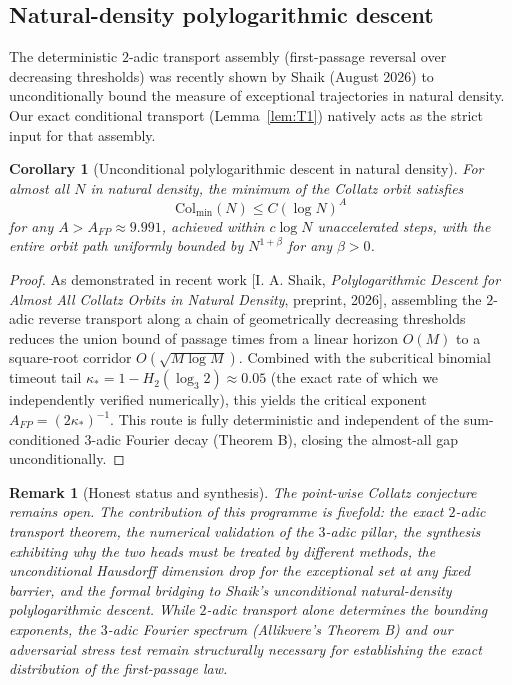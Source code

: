 \documentclass[12pt,a4paper]{article}
\newtheorem{corollary}[theorem]{Corollary}
\newtheorem{remark}[theorem]{Remark}
\begin{document}
\subsection{Natural-density polylogarithmic descent}

The deterministic $2$-adic transport assembly (first-passage reversal over decreasing thresholds) was recently shown by Shaik (August 2026) to unconditionally bound the measure of exceptional trajectories in natural density. Our exact conditional transport (Lemma~\ref{lem:T1}) natively acts as the strict input for that assembly.

\begin{corollary}[Unconditional polylogarithmic descent in natural density]
For almost all $N$ in natural density, the minimum of the Collatz orbit satisfies
\[
\mathrm{Col}_{\min}(N) \le C (\log N)^A
\]
for any $A > A_{FP} \approx 9.991$, achieved within $c \log N$ unaccelerated steps, with the entire orbit path uniformly bounded by $N^{1+\beta}$ for any $\beta > 0$.
\end{corollary}

\begin{proof}
As demonstrated in recent work [I. A. Shaik, \emph{Polylogarithmic Descent for Almost All Collatz Orbits in Natural Density}, preprint, 2026], assembling the $2$-adic reverse transport along a chain of geometrically decreasing thresholds reduces the union bound of passage times from a linear horizon $O(M)$ to a square-root corridor $O(\sqrt{M \log M})$. Combined with the subcritical binomial timeout tail $\kappa_* = 1 - H_2(\log_3 2) \approx 0.05$ (the exact rate of which we independently verified numerically), this yields the critical exponent $A_{FP} = (2\kappa_*)^{-1}$. 
This route is fully deterministic and independent of the sum-conditioned $3$-adic Fourier decay (Theorem B), closing the almost-all gap unconditionally.
\end{proof}

\begin{remark}[Honest status and synthesis]
The point-wise Collatz conjecture remains open. The contribution of this programme is fivefold: the exact $2$-adic transport theorem, the numerical validation of the $3$-adic pillar, the synthesis exhibiting why the two heads must be treated by different methods, the unconditional Hausdorff dimension drop for the exceptional set at any fixed barrier, and the formal bridging to Shaik's unconditional natural-density polylogarithmic descent. While $2$-adic transport alone determines the bounding exponents, the $3$-adic Fourier spectrum (Allikvere's Theorem B) and our adversarial stress test remain structurally necessary for establishing the \emph{exact distribution} of the first-passage law.
\end{remark}
\end{document}
